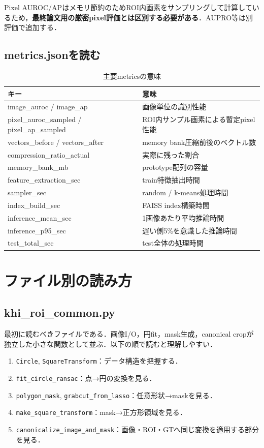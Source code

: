 \documentclass[a4paper,11pt]{ltjsreport}
\begin{document}
Pixel AUROC/APはメモリ節約のためROI内画素をサンプリングして計算しているため，\textbf{最終論文用の厳密pixel評価とは区別する必要がある}．AUPRO等は別評価で追加する．

\section{metrics.jsonを読む}
\begin{table}[H]
\centering
\caption{主要metricsの意味}
\begin{tabularx}{\linewidth}{L{48mm} Y}
\toprule
キー & 意味 \\
\midrule
image\_auroc / image\_ap & 画像単位の識別性能 \\
pixel\_auroc\_sampled / pixel\_ap\_sampled & ROI内サンプル画素による暫定pixel性能 \\
vectors\_before / vectors\_after & memory bank圧縮前後のベクトル数 \\
compression\_ratio\_actual & 実際に残った割合 \\
memory\_bank\_mb & prototype配列の容量 \\
feature\_extraction\_sec & train特徴抽出時間 \\
sampler\_sec & random / k-means処理時間 \\
index\_build\_sec & FAISS index構築時間 \\
inference\_mean\_sec & 1画像あたり平均推論時間 \\
inference\_p95\_sec & 遅い側5\%を意識した推論時間 \\
test\_total\_sec & test全体の処理時間 \\
\bottomrule
\end{tabularx}
\end{table}

\chapter{ファイル別の読み方}

\section{khi\_roi\_common.py}
最初に読むべきファイルである．画像I/O，円fit，mask生成，canonical cropが独立した小さな関数として並ぶ．以下の順で読むと理解しやすい．

\begin{enumerate}
\item \texttt{Circle}, \texttt{SquareTransform}：データ構造を把握する．
\item \texttt{fit\_circle\_ransac}：点→円の変換を見る．
\item \texttt{polygon\_mask}, \texttt{grabcut\_from\_lasso}：任意形状→maskを見る．
\item \texttt{make\_square\_transform}：mask→正方形領域を見る．
\item \texttt{canonicalize\_image\_and\_mask}：画像・ROI・GTへ同じ変換を適用する部分を見る．
\end{enumerate}
\end{document}
